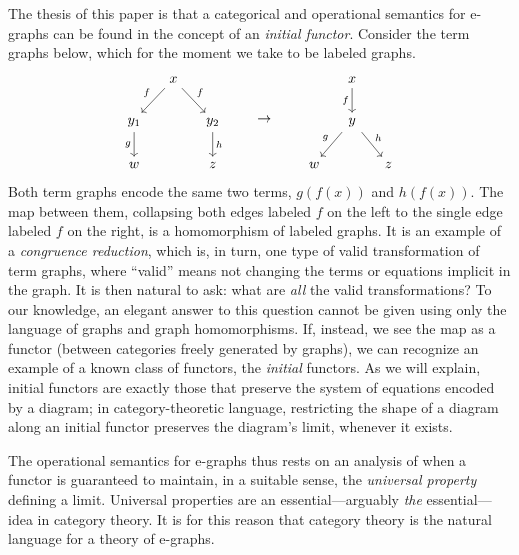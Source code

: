 \documentclass[11pt]{article}
\numberwithin{equation}{section}
\begin{document}
The thesis of this paper is that a categorical and operational semantics for
e-graphs can be found in the concept of an \emph{initial functor}. Consider the
term graphs below, which for the moment we take to be labeled graphs.
\begin{equation*}
  \begin{tikzcd}[column sep=small]
    & x & \\
    {y_1} && {y_2} \\
    w && z
    \arrow["f"', from=1-2, to=2-1]
    \arrow["f", from=1-2, to=2-3]
    \arrow["g"', from=2-1, to=3-1]
    \arrow["h", from=2-3, to=3-3]
  \end{tikzcd}
  \qquad\to\qquad
  \begin{tikzcd}[column sep=small]
    & x & \\
    & y \\
    w && z
    \arrow["f"', from=1-2, to=2-2]
    \arrow["g"', from=2-2, to=3-1]
    \arrow["h", from=2-2, to=3-3]
  \end{tikzcd}
\end{equation*}
Both term graphs encode the same two terms, $g(f(x))$ and $h(f(x))$. The map
between them, collapsing both edges labeled $f$ on the left to the single edge
labeled $f$ on the right, is a homomorphism of labeled graphs. It is an example
of a \emph{congruence reduction}, which is, in turn, one type of valid
transformation of term graphs, where ``valid'' means not changing the terms or
equations implicit in the graph. It is then natural to ask: what are \emph{all}
the valid transformations? To our knowledge, an elegant answer to this question
cannot be given using only the language of graphs and graph homomorphisms. If,
instead, we see the map as a functor (between categories freely generated by
graphs), we can recognize an example of a known class of functors, the
\emph{initial} functors. As we will explain, initial functors are exactly those
that preserve the system of equations encoded by a diagram; in
category-theoretic language, restricting the shape of a diagram along an initial
functor preserves the diagram's limit, whenever it exists.

The operational semantics for e-graphs thus rests on an analysis of when a
functor is guaranteed to maintain, in a suitable sense, the \emph{universal
  property} defining a limit. Universal properties are an essential---arguably
\emph{the} essential---idea in category theory. It is for this reason that
category theory is the natural language for a theory of e-graphs.
\end{document}
